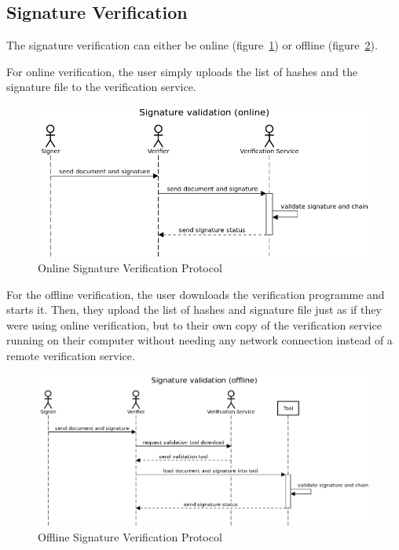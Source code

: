 \subsection{Signature Verification}\label{subsec:signature-verification}

The signature verification can either be online (figure~\ref{fig:onlinesignatureverificationprotocol})
or offline (figure~\ref{fig:offlinesignatureverificationprotocol}).

For online verification, the user simply uploads the list of hashes and the signature file to the verification service.

\begin{figure}
    \begin{center}
        \includegraphics[scale=0.5]{images/protocol_online_verification_high_level.png}
        \caption{Online Signature Verification Protocol}
        \label{fig:onlinesignatureverificationprotocol}
    \end{center}
\end{figure}

For the offline verification, the user downloads the verification programme and starts it.
Then, they upload the list of hashes and signature file just as if they were using online verification,
but to their own copy of the verification service running on their computer without needing any network connection
instead of a remote verification service.

\begin{figure}
    \begin{center}
        \includegraphics[scale=0.5]{images/protocol_offline_verification_high_level.png}
        \caption{Offline Signature Verification Protocol}
        \label{fig:offlinesignatureverificationprotocol}
    \end{center}
\end{figure}

